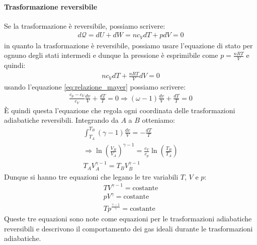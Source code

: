         \paragraph{Trasformazione reversibile}
            Se la trasformazione è reversibile, possiamo scrivere:
            \begin{align*}
                d\mathcal{Q} = dU + dW = nc_VdT + pdV = 0
            \end{align*}
            in quanto la trasformazione è reversibile, possiamo usare l'equazione di stato per ognuno degli stati intermedi e dunque la pressione è esprimibile come $p=\frac{nRT}{V}$ e quindi:
            \begin{align*}
                nc_VdT + \frac{nRT}{V}dV = 0
            \end{align*}
            usando l'equazione \ref{eq:relazione_mayer} possiamo scrivere:
            \begin{align*}
                \frac{c_p - c_V}{c_V}\frac{dv}{V} + \frac{dT}{T} = 0 \Rightarrow (\omega-1)\frac{dv}{V} + \frac{dT}{T} = 0
            \end{align*}
            È quindi questa l'equazione che regola ogni coordinata delle trasformazioni adiabatiche reversibili. Integrando da $A$ a $B$ otteniamo:
            \begin{align*}
                \int_{T_A}^{T_B} (\gamma-1)\frac{dv}{V} = -\frac{dT}{T}\\
                \Rightarrow \operatorname{ln} \left(\frac{V_B}{V_A}\right)^{\gamma-1} = \frac{c_V}{c_p} \operatorname{ln} \left(\frac{T_B}{T_A}\right)\\
                T_AV_A^{\gamma-1} = T_BV_B^{\gamma-1}
            \end{align*}
            Dunque si hanno tre equazioni che legano le tre variabili $T$, $V$ e $p$:
            \begin{align}
                TV^{\gamma-1} = \text{costante}\\
                pV^{\gamma} = \text{costante}\\
                Tp^{\frac{\gamma-1}{\gamma}} = \text{costante}
            \end{align}
            Queste tre equazioni sono note come equazioni per le trasformazioni adiabatiche reversibili e descrivono il comportamento dei gas ideali durante le trasformazioni adiabatiche.
